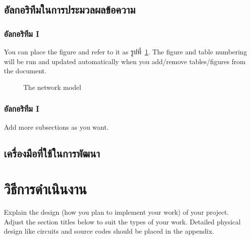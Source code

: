 \documentclass[12pt,oneside,openright,a4paper]{cpe-thai-project}
\begin{document}
\section{อัลกอริทึมในการประมวลผลข้อความ}
\subsection{อัลกอริทึม I}

You can place the figure and refer to it as รูปที่~\ref{fig:model2}.
The figure and table numbering will be run and updated automatically when you add/remove tables/figures from the document.

\begin{figure}[!h]\centering
\setlength{\fboxrule}{0.2mm} %
\setlength{\fboxsep}{1cm}
\caption{The network model}\label{fig:model2}
\end{figure}

 
\subsection{อัลกอริทึม I}
Add more subsections as you want.


\section{เครื่องมือที่ใช้ในการพัฒนา}

\chapter{วิธีการดำเนินงาน}

Explain the design (how you plan to implement your work) of your project. Adjust the section titles below to suit the types of your work. Detailed physical design like circuits and source codes should be placed in the appendix.
\end{document}
